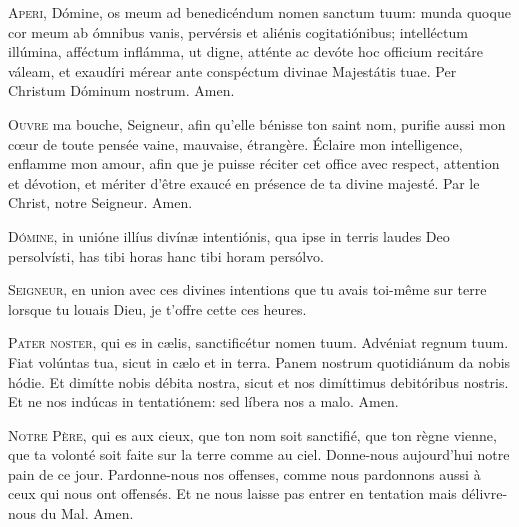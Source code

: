 \documentclass[psautier_nocturne_fr.tex]{subfiles}
\begin{document}


\begin{paracol}{2}
\lettrine{A}{peri}, Dómine, os meum ad benedicéndum nomen sanctum tuum: munda quoque cor meum ab ómnibus vanis, pervérsis et aliénis 
cogitatiónibus; intelléctum illúmina, afféctum inflámma, ut digne, atténte ac devóte hoc officium recitáre váleam, et exaudíri mérear
ante conspéctum divinae Majestátis tuae. Per Christum Dóminum nostrum. Amen.

\switchcolumn

\lettrine{O}{uvre} ma bouche, Seigneur, afin qu’elle bénisse ton saint nom, purifie aussi mon cœur de toute pensée
vaine, mauvaise, étrangère. Éclaire mon intelligence, enflamme mon amour,
afin que je puisse réciter cet office avec respect, attention et dévotion, et mériter d’être exaucé en
présence de ta divine majesté. Par le Christ, notre Seigneur. Amen.

\switchcolumn*

\lettrine{D}{ómine}, in unióne illíus divínæ intentiónis, qua ipse in terris laudes Deo persolvísti, has tibi horas  hanc tibi horam\rubric{)} persólvo.

\switchcolumn

\lettrine{S}{eigneur}, en union avec ces divines intentions que tu avais toi-même sur terre lorsque
tu louais Dieu, je t’offre cette \rubric{(}ces\rubric{)} heure\rubric{(}s\rubric{)}.

\switchcolumn*

\lettrine{P}{ater noster}, qui es in cælis, sanctificétur nomen tuum. Advéniat regnum tuum. Fiat volúntas tua, sicut in cælo et in terra.
Panem nostrum quotidiánum da nobis hódie. Et dimítte nobis débita nostra, sicut et nos dimíttimus debitóribus nostris. Et ne nos
indúcas in tentatiónem: sed líbera nos a malo. Amen.

\switchcolumn

\lettrine{N}{otre Père}, qui es aux cieux, que ton nom soit sanctifié, que ton règne vienne,
que ta volonté soit faite sur la terre comme au ciel.
Donne-nous aujourd’hui notre pain de ce jour. Pardonne-nous nos offenses, comme nous pardonnons aussi à ceux qui nous ont offensés.
Et ne nous laisse pas entrer en tentation mais délivre-nous du Mal. Amen.


\end{paracol}
\end{document}

